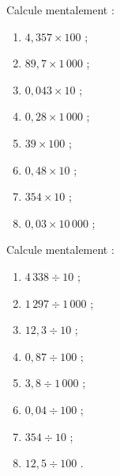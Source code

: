 \begin{exercice}
Calcule mentalement :
\begin{enumerate} 
 \item $4,357 \times 100$ \dotfill ; 
 
 \item $89,7 \times 1\,000$ \dotfill ; 
 
 \item $0,043 \times 10$ \dotfill ; 
 
 \item $0,28 \times 1\,000$ \dotfill ; 
 
 \item $39 \times 100$ \dotfill ; 
 
 \item $0,48 \times 10$ \dotfill ; 
        
 \item $354 \times 10$ \dotfill ; 
        
 \item $0,03 \times 10\,000$ \dotfill ; 
 
 \end{enumerate}
\end{exercice}
\begin{exercice}
Calcule mentalement :
\begin{enumerate} 
 \item $4\,338 \div 10$ \dotfill ; 
 
 \item $1\,297 \div 1\,000$ \dotfill ; 
        
 \item $12,3 \div 10$ \dotfill ; 
 
 \item $0,87 \div 100$ \dotfill ; 
        
 \item $3,8 \div 1\,000$ \dotfill ; 
 
 \item $0,04 \div 100$ \dotfill ; 
        
 \item $354 \div 10$ \dotfill ; 
 
 \item $12,5 \div 100$ \dotfill. 
 
 \end{enumerate}
\end{exercice}
